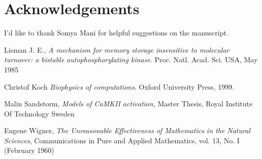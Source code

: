 \documentclass[]{resonance}
\begin{document}
\section*{Acknowledgements}
I'd like to thank Somya Mani for helpful suggestions on the manuscript.

\begin{thebibliography}{99} 
    Lisman J. E., 
    \textit{A mechanism for memory storage insensitive to molecular turnover: a
    bistable autophosphorylating kinase}. 
    Proc. Natl. Acad. Sci. USA, May 1985

    Christof Koch
    \textit{Biophysics of computations}.
    Oxford University Press, 1999.

    Malin Sandstorm,
    \textit{Models of CaMKII activation},
    Master Thesis, Royal Institute Of Technology Sweden 

    Eugene Wigner,
    \textit{The Unreasonable Effectiveness of Mathematics in the Natural Sciences},
     Communications in Pure and Applied Mathematics, vol. 13, No. I (February 1960)

\end{thebibliography}
\end{document}
